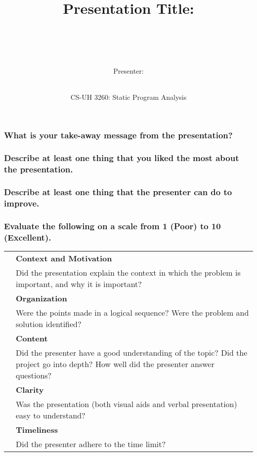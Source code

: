 \documentclass{article}
\title{Presentation Title: ~~~~~~~~~~~~~~~~~~~~~~~~~~~~~~~~~~~~~~~~~}
\author{Presenter: ~~~~~~~~~~~~~~~~~~~~~~~~~~~~~~~~~~~~~~~~~~~~~~~~~~~~~~~~~~~~~~~~~~~~~~~~}
\date{CS-UH 3260: Static Program Analysis}
\begin{document}
\maketitle

\subsubsection*{What is your take-away message from the presentation?}
\vspace{2cm}



\subsubsection*{Describe at least one thing that you liked the most about the presentation.}
\vspace{3cm}



\subsubsection*{Describe at least one thing that the presenter can do to improve.}
\vspace{3cm}


\subsubsection*{Evaluate the following on a scale from 1 (Poor) to 10 (Excellent).}

\begin{table}[h]
\begin{tabularx}{\textwidth}{| p{1cm} | X |}
	\hline
	& \textbf{Context and Motivation} \\
	& Did the presentation explain the context in which the problem is important, and why it is important? \\ \hline
	& \textbf{Organization} \\ 
	& Were the points made in a logical sequence? Were the problem and solution identified? \\ \hline
	& \textbf{Content} \\ 
	& Did the presenter have a good understanding of the topic? Did the project go into depth? How well did the presenter answer questions? \\ \hline
	& \textbf{Clarity} \\ 
	& Was the presentation (both visual aids and verbal presentation) easy to understand? \\ \hline
	& \textbf{Timeliness} \\
	& Did the presenter adhere to the time limit? \\ \hline 
\end{tabularx}
\end{table}
\end{document}
